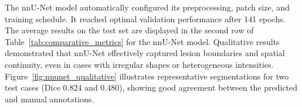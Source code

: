 \documentclass[12pt]{article}
\begin{document}

%
The nnU-Net model automatically configured its preprocessing, patch size, and training schedule. It reached optimal validation performance after 141 epochs. %
The average results on the test set are displayed in the second row of Table~\ref{tab:comparative_metrics} for the nnU-Net model.
%
Qualitative results demonstrated that nnU-Net effectively captured lesion boundaries and spatial continuity, even in cases with irregular shapes or heterogeneous intensities. Figure~\ref{fig:nnunet_qualitative} illustrates representative segmentations for two test cases (Dice 0.824 and 0.480), showing good agreement between the predicted and manual annotations.


\end{document}
